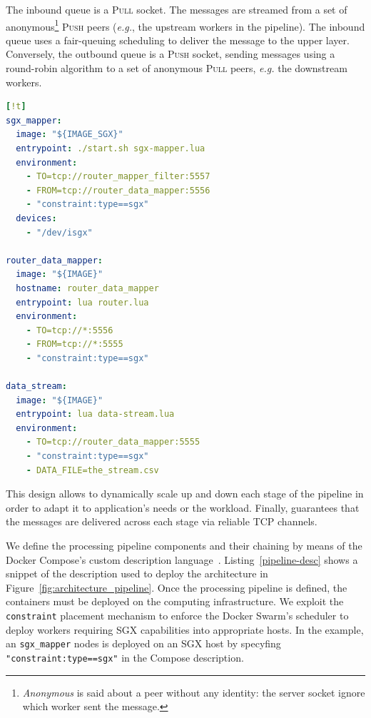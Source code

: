 The inbound queue is a \textsc{Pull} socket.
The messages are streamed from a set of anonymous\footnote{\emph{Anonymous} is said about a peer without any identity: the server socket ignore which worker sent the message.} \textsc{Push} peers (\emph{e.g.}, the upstream workers in the pipeline).
The inbound queue uses a fair-queuing scheduling to deliver the message to the upper layer.
Conversely, the outbound queue is a \textsc{Push} socket, sending messages using a round-robin algorithm to a set of anonymous \textsc{Pull} peers, \emph{e.g.} the downstream workers.
\begin{lstlisting}[language=YAML,caption={\SYS pipeline examples. Some attributes (\texttt{volume}, \texttt{networks}, \texttt{env\_file}) omitted.},label=pipeline-desc][!t]
sgx_mapper:
  image: "${IMAGE_SGX}"
  entrypoint: ./start.sh sgx-mapper.lua
  environment:
    - TO=tcp://router_mapper_filter:5557
    - FROM=tcp://router_data_mapper:5556
    - "constraint:type==sgx"
  devices:
    - "/dev/isgx"

router_data_mapper:
  image: "${IMAGE}"
  hostname: router_data_mapper
  entrypoint: lua router.lua
  environment:
    - TO=tcp://*:5556
    - FROM=tcp://*:5555
    - "constraint:type==sgx"

data_stream:
  image: "${IMAGE}"
  entrypoint: lua data-stream.lua
  environment:
    - TO=tcp://router_data_mapper:5555
    - "constraint:type==sgx"
    - DATA_FILE=the_stream.csv
\end{lstlisting}


This design allows to dynamically scale up and down each stage of the pipeline in order to adapt it to application's needs or the workload.
Finally, \zmq guarantees that the messages are delivered across each stage via reliable TCP channels.


We define the processing pipeline components and their chaining by means of the Docker Compose's custom description language~\cite{docker:compose}.
Listing~\ref{pipeline-desc} shows a snippet of the description used to deploy the architecture in Figure~\ref{fig:architecture_pipeline}.
Once the processing pipeline is defined, the containers must be deployed on the computing infrastructure.
We exploit the \texttt{constraint} placement mechanism to enforce the Docker Swarm's scheduler to deploy workers requiring SGX capabilities into appropriate hosts.
In the example, an \texttt{sgx\_mapper} nodes is deployed on an SGX host by specyfing \texttt{"constraint:type==sgx"} in the Compose description.




